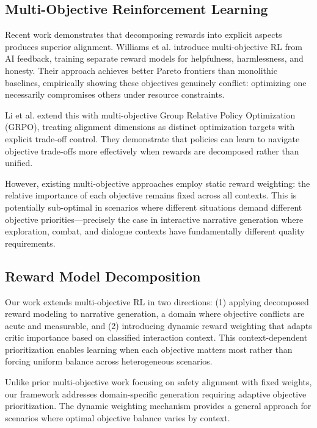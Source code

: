 \documentclass[11pt]{article}
\begin{document}
\subsection{Multi-Objective Reinforcement Learning}

Recent work demonstrates that decomposing rewards into explicit aspects produces superior alignment. Williams et al. \cite{williams2024multi} introduce multi-objective RL from AI feedback, training separate reward models for helpfulness, harmlessness, and honesty. Their approach achieves better Pareto frontiers than monolithic baselines, empirically showing these objectives genuinely conflict: optimizing one necessarily compromises others under resource constraints.

Li et al. \cite{li2025optimizing} extend this with multi-objective Group Relative Policy Optimization (GRPO), treating alignment dimensions as distinct optimization targets with explicit trade-off control. They demonstrate that policies can learn to navigate objective trade-offs more effectively when rewards are decomposed rather than unified.

However, existing multi-objective approaches employ static reward weighting: the relative importance of each objective remains fixed across all contexts. This is potentially sub-optimal in scenarios where different situations demand different objective priorities—precisely the case in interactive narrative generation where exploration, combat, and dialogue contexts have fundamentally different quality requirements.

\subsection{Reward Model Decomposition}

Our work extends multi-objective RL in two directions: (1) applying decomposed reward modeling to narrative generation, a domain where objective conflicts are acute and measurable, and (2) introducing dynamic reward weighting that adapts critic importance based on classified interaction context. This context-dependent prioritization enables learning when each objective matters most rather than forcing uniform balance across heterogeneous scenarios.

Unlike prior multi-objective work focusing on safety alignment with fixed weights, our framework addresses domain-specific generation requiring adaptive objective prioritization. The dynamic weighting mechanism provides a general approach for scenarios where optimal objective balance varies by context.
\end{document}
